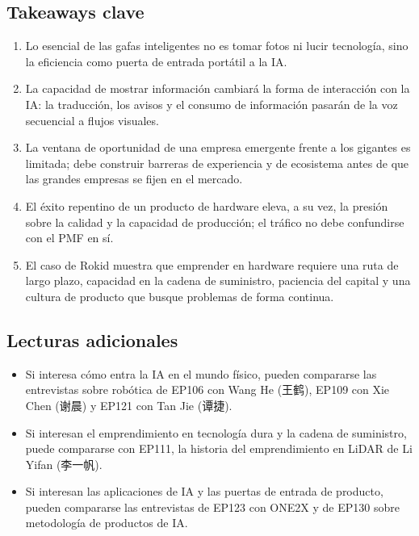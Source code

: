 \documentclass[a4paper]{article}
\begin{document}
\subsection{Takeaways clave}

\begin{enumerate}
\item Lo esencial de las gafas inteligentes no es tomar fotos ni lucir tecnología, sino la eficiencia como puerta de entrada portátil a la IA.
\item La capacidad de mostrar información cambiará la forma de interacción con la IA: la traducción, los avisos y el consumo de información pasarán de la voz secuencial a flujos visuales.
\item La ventana de oportunidad de una empresa emergente frente a los gigantes es limitada; debe construir barreras de experiencia y de ecosistema antes de que las grandes empresas se fijen en el mercado.
\item El éxito repentino de un producto de hardware eleva, a su vez, la presión sobre la calidad y la capacidad de producción; el tráfico no debe confundirse con el PMF en sí.
\item El caso de Rokid muestra que emprender en hardware requiere una ruta de largo plazo, capacidad en la cadena de suministro, paciencia del capital y una cultura de producto que busque problemas de forma continua.
\end{enumerate}

\subsection{Lecturas adicionales}

\begin{itemize}
\item Si interesa cómo entra la IA en el mundo físico, pueden compararse las entrevistas sobre robótica de EP106 con Wang He (王鹤), EP109 con Xie Chen (谢晨) y EP121 con Tan Jie (谭捷).
\item Si interesan el emprendimiento en tecnología dura y la cadena de suministro, puede compararse con EP111, la historia del emprendimiento en LiDAR de Li Yifan (李一帆).
\item Si interesan las aplicaciones de IA y las puertas de entrada de producto, pueden compararse las entrevistas de EP123 con ONE2X y de EP130 sobre metodología de productos de IA.
\end{itemize}
\end{document}

